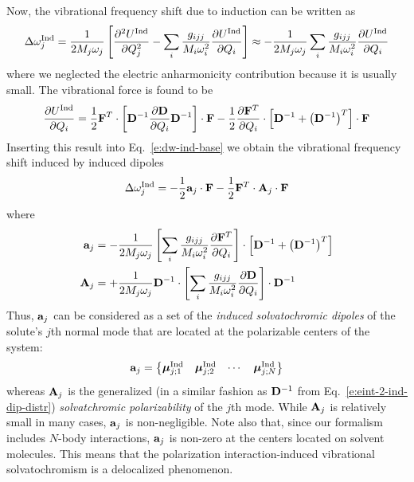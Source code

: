 \documentclass[a4paper,titlepage,twoside,fleqn,12pt]{book}
\newcommand{\BM}[1]{\bm{#1}}
\newcommand{\fderiv}[2]{\ensuremath{
\frac{\partial #1}{\partial #2}}}
\newcommand{\sderiv}[2]{\ensuremath{
\frac{\partial^2 #1}{\partial #2^2}
}}
\begin{document}
\begin{refsection}
Now, the vibrational frequency shift due to induction can be written
as
%
\begin{equation}\label{e:dw-ind-base}
\Delta \omega_j^{\rm Ind} =
\frac{1}{2M_j\omega_j} \left[ 
\sderiv{U^{\rm Ind}}{Q_j} -
\sum_i \frac{g_{ijj}}{M_i\omega_i^2}\fderiv{U^{\rm Ind}}{Q_i}
\right]
\approx 
-\frac{1}{2M_j\omega_j}\sum_i \frac{g_{ijj}}{M_i\omega_i^2}\fderiv{U^{\rm Ind}}{Q_i}
\end{equation}
%
where we neglected the electric anharmonicity contribution because it is usually small.
The vibrational force is found to be
%
\begin{equation} \label{e:vibr-force-ind}
\fderiv{U^{\rm Ind}}{Q_i} = \frac{1}{2} {\bf F}^{T} \cdot
     \left[ 
           {\bf D}^{-1} \fderiv{{\bf D}}{Q_i} {\bf D}^{-1}
     \right] \cdot {\bf F}
     - \frac{1}{2} \fderiv{{\bf F}^{T}}{Q_i} \cdot
     \left[
            {\bf D}^{-1} + \left({\bf D}^{-1} \right)^T
     \right] \cdot {\bf F}
\end{equation}
%
Inserting this result into Eq.~\eqref{e:dw-ind-base}
we obtain the vibrational frequency shift induced by induced dipoles
%
\begin{equation}\label{e:dw-ind-avec}
\Delta\omega_j^{\rm Ind} = - \frac{1}{2}                 {\bf a}_j \cdot {\bf F} 
                           - \frac{1}{2} {\bf F}^T \cdot {\bf A}_j \cdot {\bf F}
\end{equation}
%
where
%
\begin{subequations} \label{e:a-A}
 \begin{align}
 {\bf a}_j &= -\frac{1}{2M_j\omega_j} \left[ \sum_i \frac{g_{ijj}}{M_i\omega_i^2} 
               \fderiv{{\bf F}^T}{Q_i} \right] \cdot \left[ {\bf D}^{-1} + \left({\bf D}^{-1}\right)^T\right]\\
%
 {\bf A}_j &= +\frac{1}{2M_j\omega_j} {\bf D}^{-1} \cdot 
               \left[ \sum_i \frac{g_{ijj}}{M_i\omega_i^2} \fderiv{{\bf D}}{Q_i} \right] 
               \cdot {\bf D}^{-1}
 \end{align}
\end{subequations}
%
Thus, ${\bf a}_j$ can be considered as a set of the \emph{induced
solvatochromic dipoles} of the solute's $j$th normal mode that are 
located at the polarizable centers of the system:
%
\begin{equation} \label{e:a-vec}
 {\bf a}_j =
 \begin{Bmatrix}
  {\BM \mu}_{j;1}^{\rm Ind} & {\BM \mu}_{j;2}^{\rm Ind} & \cdots & {\BM \mu}_{j;N}^{\rm Ind}
 \end{Bmatrix}
\end{equation}
%
whereas ${\bf A}_j$ is the generalized (in a similar fashion as ${\bf D}^{-1}$ 
from Eq.~\eqref{e:eint-2-ind-dip-distr}) \emph{solvatchromic polarizability} of the $j$th mode.
While ${\bf A}_j$ is relatively small in many cases, ${\bf a}_j$ is non\hyp{}negligible.
Note also that, since our formalism includes $N$\hyp{}body interactions,
${\bf a}_j$ is non\hyp{}zero at the centers located on solvent molecules.
This means that the polarization interaction\hyp{}induced vibrational solvatochromism
is a delocalized phenomenon.


\end{refsection}
\end{document}
